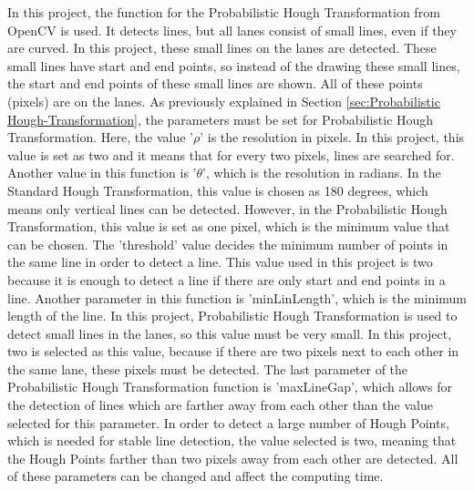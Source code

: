 In this project, the function for the Probabilistic Hough Transformation from OpenCV is used. It detects lines, but all lanes consist of small lines, even if they are curved. In this project, these small lines on the lanes are detected. These small lines have start and end points, so instead of the drawing these small lines, the start and end points of these small lines are shown. All of these points (pixels) are on the lanes. As previously explained in Section \ref{sec:Probabilistic Hough-Transformation}, the parameters must be set for Probabilistic Hough Transformation. Here, the value '$\rho$' is the resolution in pixels. In this project, this value is set as two and it means that for every two pixels, lines are searched for.  Another value in this function is '$\theta$', which is the resolution in radians. In the Standard Hough Transformation, this value is chosen as 180 degrees, which means only vertical lines can be detected. However, in the Probabilistic Hough Transformation, this value is set as one pixel, which is the minimum value that can be chosen. The 'threshold' value decides the minimum number of points in the same line in order to detect a line. This value used in this project is two because it is enough to detect a line if there are only start and end points in a line. Another parameter in this function is 'minLinLength', which is the minimum length of the line. In this project, Probabilistic Hough Transformation is used to detect small lines in the lanes, so this value must be very small. In this project, two is selected as this value, because if there are two pixels next to each other in the same lane, these pixels must be detected. The last parameter of the Probabilistic Hough Transformation function is 'maxLineGap', which allows for the detection of lines which are farther away from each other than the value selected for this parameter. In order to detect a large number of Hough Points, which is needed for stable line detection, the value selected is two, meaning that the Hough Points farther than two pixels away from each other are detected. All of these parameters can be changed and affect the computing time. 


